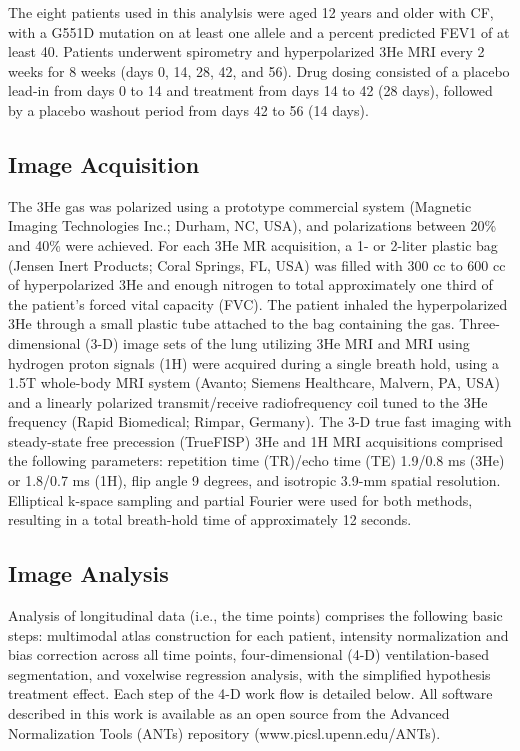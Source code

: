 \documentclass[11pt,]{article}
\begin{document}
The eight patients used in this analylsis were aged 12 years and older
with CF, with a G551D mutation on at least one allele and a percent
predicted FEV1 of at least 40. Patients underwent spirometry and
hyperpolarized 3He MRI every 2 weeks for 8 weeks (days 0, 14, 28, 42,
and 56). Drug dosing consisted of a placebo lead-in from days 0 to 14
and treatment from days 14 to 42 (28 days), followed by a placebo
washout period from days 42 to 56 (14 days).

\subsection{Image Acquisition}\label{image-acquisition}

The 3He gas was polarized using a prototype commercial system (Magnetic
Imaging Technologies Inc.; Durham, NC, USA), and polarizations between
20\% and 40\% were achieved. For each 3He MR acquisition, a 1- or
2-liter plastic bag (Jensen Inert Products; Coral Springs, FL, USA) was
filled with 300 cc to 600 cc of hyperpolarized 3He and enough nitrogen
to total approximately one third of the patient's forced vital capacity
(FVC). The patient inhaled the hyperpolarized 3He through a small
plastic tube attached to the bag containing the gas. Three-dimensional
(3-D) image sets of the lung utilizing 3He MRI and MRI using hydrogen
proton signals (1H) were acquired during a single breath hold, using a
1.5T whole-body MRI system (Avanto; Siemens Healthcare, Malvern, PA,
USA) and a linearly polarized transmit/receive radiofrequency coil tuned
to the 3He frequency (Rapid Biomedical; Rimpar, Germany). The 3-D true
fast imaging with steady-state free precession (TrueFISP) 3He and 1H MRI
acquisitions comprised the following parameters: repetition time
(TR)/echo time (TE) 1.9/0.8 ms (3He) or 1.8/0.7 ms (1H), flip angle 9
degrees, and isotropic 3.9-mm spatial resolution. Elliptical k-space
sampling and partial Fourier were used for both methods, resulting in a
total breath-hold time of approximately 12 seconds.

\subsection{Image Analysis}\label{image-analysis}

Analysis of longitudinal data (i.e., the time points) comprises the
following basic steps: multimodal atlas construction for each patient,
intensity normalization and bias correction across all time points,
four-dimensional (4-D) ventilation-based segmentation, and voxelwise
regression analysis, with the simplified hypothesis treatment effect.
Each step of the 4-D work flow is detailed below. All software described
in this work is available as an open source from the Advanced
Normalization Tools (ANTs) repository (www.picsl.upenn.edu/ANTs).
\end{document}
